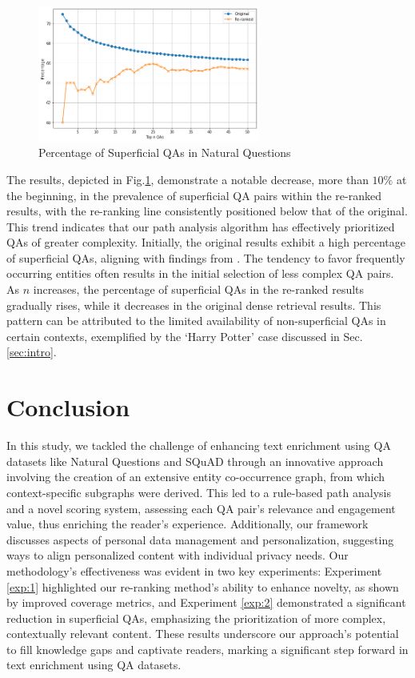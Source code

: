 \documentclass[11pt]{article}
\begin{document}
\begin{figure}[h]
  \centering
  \includegraphics[width=0.65\textwidth]{submissions/Tung2023/figs/sup_re.png}
  \caption{Percentage of Superficial QAs in Natural Questions}
  \label{fig:superficial_qas}
\end{figure}

The results, depicted in Fig.\ref{fig:superficial_qas}, demonstrate a notable decrease, more than $10\%$ at the beginning, in the prevalence of superficial QA pairs within the re-ranked results, with the re-ranking line consistently positioned below that of the original. This trend indicates that our path analysis algorithm has effectively prioritized QAs of greater complexity. Initially, the original results exhibit a high percentage of superficial QAs, aligning with findings from \cite{sciavolino2021simple}. The tendency to favor frequently occurring entities often results in the initial selection of less complex QA pairs. As $n$ increases, the percentage of superficial QAs in the re-ranked results gradually rises, while it decreases in the original dense retrieval results. This pattern can be attributed to the limited availability of non-superficial QAs in certain contexts, exemplified by the `Harry Potter' case discussed in Sec.\ref{sec:intro}.


% 
\section{Conclusion}

In this study, we tackled the challenge of enhancing text enrichment using QA datasets like Natural Questions and SQuAD through an innovative approach involving the creation of an extensive entity co-occurrence graph, from which context-specific subgraphs were derived. This led to a rule-based path analysis and a novel scoring system, assessing each QA pair's relevance and engagement value, thus enriching the reader's experience. Additionally, our framework discusses aspects of personal data management and personalization, suggesting ways to align personalized content with individual privacy needs. Our methodology's effectiveness was evident in two key experiments: Experiment \ref{exp:1} highlighted our re-ranking method's ability to enhance novelty, as shown by improved coverage metrics, and Experiment \ref{exp:2} demonstrated a significant reduction in superficial QAs, emphasizing the prioritization of more complex, contextually relevant content. These results underscore our approach's potential to fill knowledge gaps and captivate readers, marking a significant step forward in text enrichment using QA datasets. 
\end{document}
